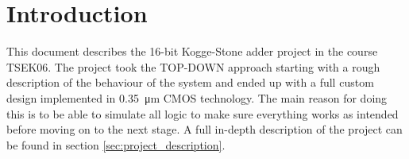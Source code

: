\section{Introduction}
This document describes the 16-bit Kogge-Stone adder project in the course TSEK06. The project took the TOP-DOWN approach starting with a rough description of the behaviour of the system and ended up with a full custom design implemented in \SI{0.35}{\micro\m} CMOS technology. The main reason for doing this is to be able to simulate all logic to make sure everything works as intended before moving on to the next stage. A full in-depth description of the project can be found in section \ref{sec:project_description}.
